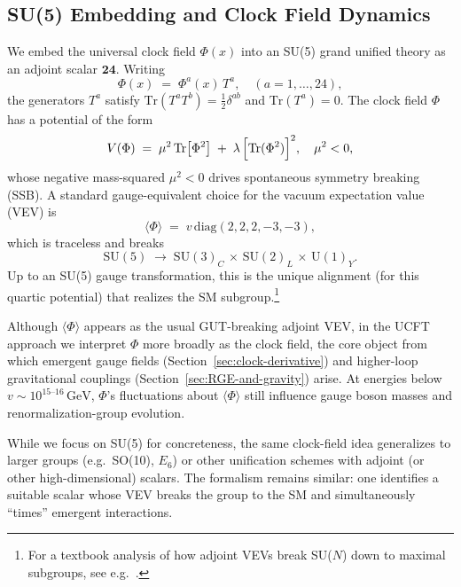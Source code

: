 \documentclass[aps,prd,preprint,groupedaddress]{revtex4-2}
\begin{document}
\subsection{SU(5) Embedding and Clock Field Dynamics}
\label{subsec:adjoint}

We embed the universal clock field \(\Phi(x)\) into an SU(5) grand unified theory as an adjoint scalar \(\mathbf{24}\).  
Writing
\begin{equation}
\Phi(x) \;=\; \Phi^a(x)\,T^a, 
\quad
(a=1,\dots,24),
\end{equation}
the generators \(T^a\) satisfy \(\mathrm{Tr}(T^a T^b) = \tfrac12 \delta^{ab}\) and \(\mathrm{Tr}(T^a) = 0\).  
The clock field \(\Phi\) has a potential of the form
\begin{equation}
V(\Phi) \;=\; \mu^2\,\mathrm{Tr}\bigl[\Phi^2\bigr]
\;+\;
\lambda\,\Bigl[\mathrm{Tr}(\Phi^2)\Bigr]^2,
\quad
\mu^2 < 0,
\label{eq:Phi-potential}
\end{equation}
whose negative mass-squared \(\mu^2<0\) drives spontaneous symmetry breaking (SSB).  
A standard gauge-equivalent choice for the vacuum expectation value (VEV) is
\begin{equation}
\langle\Phi\rangle \;=\;
v\,\mathrm{diag}(2,2,2,-3,-3),
\label{eq:Phi-VEV}
\end{equation}
which is traceless and breaks
\[
\mathrm{SU}(5)
\;\longrightarrow\;
\mathrm{SU}(3)_{C}\,\times\,\mathrm{SU}(2)_{L}\,\times\,\mathrm{U}(1)_{Y}.
\]
Up to an SU(5) gauge transformation, this is the unique alignment (for this quartic potential) that realizes the SM subgroup.\footnote{For a textbook analysis of how adjoint VEVs break SU(\(N\)) down to maximal subgroups, see e.g.\ \cite{Georgi:LieAlgebras}.}

Although \(\langle\Phi\rangle\) appears as the usual GUT-breaking adjoint VEV, in the UCFT approach we interpret \(\Phi\) more broadly as the clock field, the core object from which emergent gauge fields (Section~\ref{sec:clock-derivative}) and higher-loop gravitational couplings (Section~\ref{sec:RGE-and-gravity}) arise.  
At energies below \(v \sim 10^{15\text{--}16}\,\mathrm{GeV}\), \(\Phi\)’s fluctuations about \(\langle\Phi\rangle\) still influence gauge boson masses and renormalization-group evolution.

While we focus on SU(5) for concreteness, the same clock-field idea generalizes to larger groups (e.g.\ SO(10), \(E_6\)) or other unification schemes with adjoint (or other high-dimensional) scalars.  
The formalism remains similar: one identifies a suitable scalar whose VEV breaks the group to the SM and simultaneously “times” emergent interactions.
\end{document}
